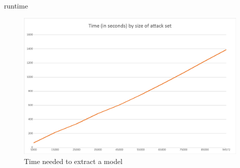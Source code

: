 \documentclass[10pt]{beamer}
\begin{document}
\begin{frame}[fragile]{runtime}
    \begin{figure}[h!]
        \centering      \includegraphics[scale=0.4]{exercise_3/paper/images/Time_copy_cat.png}
        \caption{Time needed to extract a model}
        \label{fig:time_cat}
    \end{figure}
\end{frame}
\end{document}
